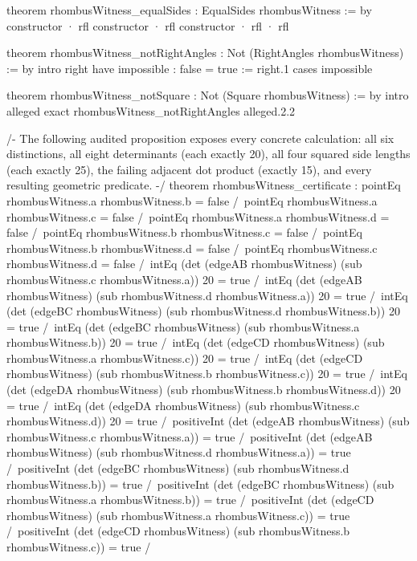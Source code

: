 \documentclass[11pt]{article}
\begin{document}
\begin{Vlean}
theorem rhombusWitness_equalSides : EqualSides rhombusWitness := by
  constructor
  · rfl
  constructor
  · rfl
  constructor
  · rfl
  · rfl

theorem rhombusWitness_notRightAngles :
    Not (RightAngles rhombusWitness) := by
  intro right
  have impossible : false = true := right.1
  cases impossible

theorem rhombusWitness_notSquare : Not (Square rhombusWitness) := by
  intro alleged
  exact rhombusWitness_notRightAngles alleged.2.2

/- The following audited proposition exposes every concrete calculation:
all six distinctions, all eight determinants (each exactly 20), all four
squared side lengths (each exactly 25), the failing adjacent dot product
(exactly 15), and every resulting geometric predicate. -/
theorem rhombusWitness_certificate :
    pointEq rhombusWitness.a rhombusWitness.b = false /\
    pointEq rhombusWitness.a rhombusWitness.c = false /\
    pointEq rhombusWitness.a rhombusWitness.d = false /\
    pointEq rhombusWitness.b rhombusWitness.c = false /\
    pointEq rhombusWitness.b rhombusWitness.d = false /\
    pointEq rhombusWitness.c rhombusWitness.d = false /\
    intEq (det (edgeAB rhombusWitness)
      (sub rhombusWitness.c rhombusWitness.a)) 20 = true /\
    intEq (det (edgeAB rhombusWitness)
      (sub rhombusWitness.d rhombusWitness.a)) 20 = true /\
    intEq (det (edgeBC rhombusWitness)
      (sub rhombusWitness.d rhombusWitness.b)) 20 = true /\
    intEq (det (edgeBC rhombusWitness)
      (sub rhombusWitness.a rhombusWitness.b)) 20 = true /\
    intEq (det (edgeCD rhombusWitness)
      (sub rhombusWitness.a rhombusWitness.c)) 20 = true /\
    intEq (det (edgeCD rhombusWitness)
      (sub rhombusWitness.b rhombusWitness.c)) 20 = true /\
    intEq (det (edgeDA rhombusWitness)
      (sub rhombusWitness.b rhombusWitness.d)) 20 = true /\
    intEq (det (edgeDA rhombusWitness)
      (sub rhombusWitness.c rhombusWitness.d)) 20 = true /\
    positiveInt (det (edgeAB rhombusWitness)
      (sub rhombusWitness.c rhombusWitness.a)) = true /\
    positiveInt (det (edgeAB rhombusWitness)
      (sub rhombusWitness.d rhombusWitness.a)) = true /\
    positiveInt (det (edgeBC rhombusWitness)
      (sub rhombusWitness.d rhombusWitness.b)) = true /\
    positiveInt (det (edgeBC rhombusWitness)
      (sub rhombusWitness.a rhombusWitness.b)) = true /\
    positiveInt (det (edgeCD rhombusWitness)
      (sub rhombusWitness.a rhombusWitness.c)) = true /\
    positiveInt (det (edgeCD rhombusWitness)
      (sub rhombusWitness.b rhombusWitness.c)) = true /\

\end{Vlean}
\end{document}
